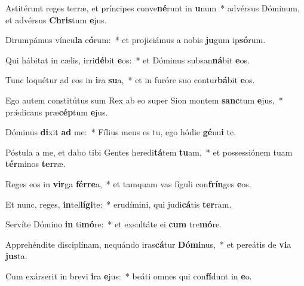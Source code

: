 \item Astitérunt reges terræ, et príncipes conve\textbf{né}runt in \textbf{u}num~* advérsus Dóminum, et advérsus \textbf{Chris}tum \textbf{e}jus.
\item Dirumpámus víncu\textbf{la} e\textbf{ó}rum:~* et projiciámus a nobis \textbf{ju}gum ip\textbf{só}rum.
\item Qui hábitat in cælis, irri\textbf{dé}bit \textbf{e}os:~* et Dóminus subsan\textbf{ná}bit \textbf{e}os.
\item Tunc loquétur ad eos in \textbf{i}ra \textbf{su}a,~* et in furóre suo contur\textbf{bá}bit \textbf{e}os.
\item Ego autem constitútus sum Rex ab eo super Sion montem \textbf{sanc}tum \textbf{e}jus,~* prǽdicans præ\textbf{cép}tum \textbf{e}jus.
\item Dóminus \textbf{di}xit \textbf{ad} me:~* Fílius meus es tu, ego hódie \textbf{gé}nu\textbf{i} te.
\item Póstula a me, et dabo tibi Gentes heredi\textbf{tá}tem \textbf{tu}am,~* et possessiónem tuam \textbf{tér}minos \textbf{ter}ræ.
\item Reges eos in \textbf{vir}ga \textbf{fér}\textbf{re}a,~* et tamquam vas fíguli con\textbf{frín}ges \textbf{e}os.
\item Et nunc, reges, \textbf{in}tel\textbf{lí}\textbf{gi}te:~* erudímini, qui judi\textbf{cá}tis \textbf{ter}ram.
\item Servíte Dómino \textbf{in} ti\textbf{mó}re:~* et exsultáte ei \textbf{cum} tre\textbf{mó}re.
\item Apprehéndite disciplínam, nequándo iras\textbf{cá}tur \textbf{Dó}\textbf{mi}nus,~* et pereátis de \textbf{vi}a \textbf{jus}ta.
\item Cum exárserit in brevi \textbf{i}ra \textbf{e}jus:~* beáti omnes qui con\textbf{fí}dunt in \textbf{e}o.
